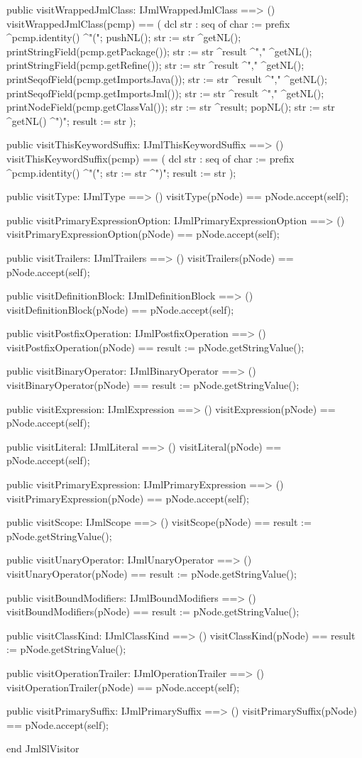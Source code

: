 \begin{vdm_al}
  public visitWrappedJmlClass: IJmlWrappedJmlClass ==> ()
  visitWrappedJmlClass(pcmp) ==
    ( dcl str : seq of char := prefix ^pcmp.identity() ^"(";
      pushNL();
      str := str ^getNL();
      printStringField(pcmp.getPackage());
      str := str ^result ^"," ^getNL();
      printStringField(pcmp.getRefine());
      str := str ^result ^"," ^getNL();
      printSeqofField(pcmp.getImportsJava());
      str := str ^result ^"," ^getNL();
      printSeqofField(pcmp.getImportsJml());
      str := str ^result ^"," ^getNL();
      printNodeField(pcmp.getClassVal());
      str := str ^result;
      popNL();
      str := str ^getNL() ^")";
      result := str );

  public visitThisKeywordSuffix: IJmlThisKeywordSuffix ==> ()
  visitThisKeywordSuffix(pcmp) ==
    ( dcl str : seq of char := prefix ^pcmp.identity() ^"(";
      str := str ^")";
      result := str );

  public visitType: IJmlType ==> ()
  visitType(pNode) == pNode.accept(self);

  public visitPrimaryExpressionOption: IJmlPrimaryExpressionOption ==> ()
  visitPrimaryExpressionOption(pNode) == pNode.accept(self);

  public visitTrailers: IJmlTrailers ==> ()
  visitTrailers(pNode) == pNode.accept(self);

  public visitDefinitionBlock: IJmlDefinitionBlock ==> ()
  visitDefinitionBlock(pNode) == pNode.accept(self);

  public visitPostfixOperation: IJmlPostfixOperation ==> ()
  visitPostfixOperation(pNode) == result := pNode.getStringValue();

  public visitBinaryOperator: IJmlBinaryOperator ==> ()
  visitBinaryOperator(pNode) == result := pNode.getStringValue();

  public visitExpression: IJmlExpression ==> ()
  visitExpression(pNode) == pNode.accept(self);

  public visitLiteral: IJmlLiteral ==> ()
  visitLiteral(pNode) == pNode.accept(self);

  public visitPrimaryExpression: IJmlPrimaryExpression ==> ()
  visitPrimaryExpression(pNode) == pNode.accept(self);

  public visitScope: IJmlScope ==> ()
  visitScope(pNode) == result := pNode.getStringValue();

  public visitUnaryOperator: IJmlUnaryOperator ==> ()
  visitUnaryOperator(pNode) == result := pNode.getStringValue();

  public visitBoundModifiers: IJmlBoundModifiers ==> ()
  visitBoundModifiers(pNode) == result := pNode.getStringValue();

  public visitClassKind: IJmlClassKind ==> ()
  visitClassKind(pNode) == result := pNode.getStringValue();

  public visitOperationTrailer: IJmlOperationTrailer ==> ()
  visitOperationTrailer(pNode) == pNode.accept(self);

  public visitPrimarySuffix: IJmlPrimarySuffix ==> ()
  visitPrimarySuffix(pNode) == pNode.accept(self);

end JmlSlVisitor
\end{vdm_al}
